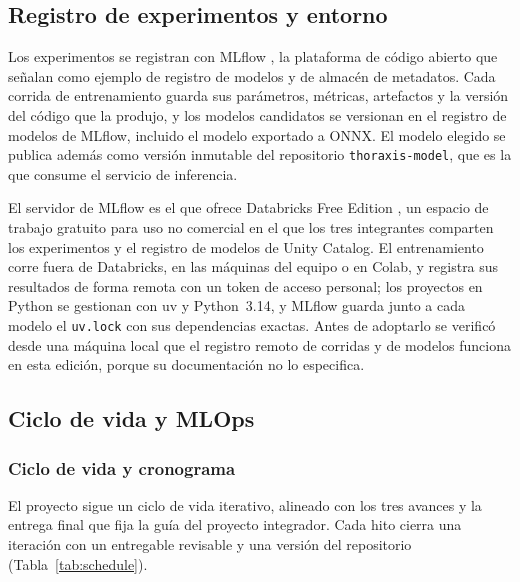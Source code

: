 \subsection{Registro de experimentos y entorno}\label{sec:experiments}
Los experimentos se registran con MLflow \parencite{mlflow}, la plataforma de
código abierto que \textcite{kreuzberger2023} señalan como ejemplo de registro
de modelos y de almacén de metadatos. Cada corrida de entrenamiento guarda sus
parámetros, métricas, artefactos y la versión del código que la produjo, y los
modelos candidatos se versionan en el registro de modelos de MLflow, incluido
el modelo exportado a ONNX. El modelo elegido se publica además como versión
inmutable del repositorio \texttt{thoraxis-model}, que es la que consume el
servicio de inferencia.

El servidor de MLflow es el que ofrece Databricks Free Edition
\parencite{databricksfree}, un espacio de trabajo gratuito para uso no
comercial en el que los tres integrantes comparten los experimentos y el
registro de modelos de Unity Catalog. El entrenamiento corre fuera de
Databricks, en las máquinas del equipo o en Colab, y registra sus resultados
de forma remota con un token de acceso personal; los proyectos en Python se
gestionan con uv y Python~3.14, y MLflow guarda junto a cada modelo el
\texttt{uv.lock} con sus dependencias exactas. Antes de adoptarlo se verificó
desde una máquina local que el registro remoto de corridas y de modelos
funciona en esta edición, porque su documentación no lo especifica.


\subsection{Ciclo de vida y MLOps}\label{sec:lifecycle}

\subsubsection{Ciclo de vida y cronograma}\label{sec:schedule}
El proyecto sigue un ciclo de vida iterativo, alineado con los tres avances y
la entrega final que fija la guía del proyecto integrador. Cada hito cierra una
iteración con un entregable revisable y una versión del repositorio
(Tabla~\ref{tab:schedule}).

